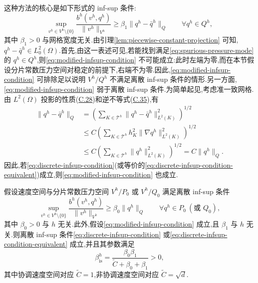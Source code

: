 \begin{note}\label{note:modified-infsup-condition}
这种方法的核心是如下形式的 inf-sup 条件:
\begin{equation}\label{eq:modified-infsup-condition}
  \sup_{v^h\in V^h\setminus\{0\}}
    \frac{b^h(v^h,q^h)}{\|v^h\|_{V^h}}
  \ge\beta_1\|q^h-\bar q^h\|_Q
  \qquad\forall q^h\in Q^h,
\end{equation}
其中 $\beta_1>0$ 与网格宽度无关.由引理\ref{lem:piecewise-constant-projection} 可知,$q^h-\bar q^h\in L_0^2(\Omega)$.首先,由这一表述可见,若能找到满足\cref{eq:spurious-pressure-mode} 的 $q^h\in Q^h$,则\cref{eq:modified-infsup-condition} 不可能成立:此时左端为零,而在本节假设分片常数压力空间对稳定的前提下,右端不为零.因此,\cref{eq:modified-infsup-condition} 可排除足以说明 $V^h/Q^h$ 不满足离散 inf-sup 条件的情形.另一方面,\cref{eq:modified-infsup-condition} 弱于离散 inf-sup 条件.为简单起见,考虑准一致网格.由 $L^2(\Omega)$ 投影的性质(\hyperref[eq:appendix-c-28]{C.28})和逆不等式(\hyperref[eq:appendix-c-35]{C.35}),有
\[
\begin{aligned}
  \|q^h-\bar q^h\|_Q
  &=\left(\sum_{K\in\mathcal{T}^h}
        \|q^h-\bar q^h\|_{L^2(K)}^2\right)^{1/2}\\
  &\le C\left(\sum_{K\in\mathcal{T}^h}
        h_K^2\|\nabla q^h\|_{L^2(K)}^2\right)^{1/2}\\
  &\le C\left(\sum_{K\in\mathcal{T}^h}
        \|q^h\|_{L^2(K)}^2\right)^{1/2}
   =C\|q^h\|_Q.
\end{aligned}
\]
因此,若\cref{eq:discrete-infsup-condition}(或等价的\cref{eq:discrete-infsup-condition-equivalent})成立,则\cref{eq:modified-infsup-condition} 也成立.
\end{note}

\begin{theorem}\label{thm:pressure-splitting-infsup}
假设速度空间与分片常数压力空间 $V^h/P_0$ 或 $V^h/Q_0$ 满足离散 inf-sup 条件
\begin{equation}\label{eq:piecewise-constant-infsup}
  \sup_{v^h\in V^h\setminus\{0\}}
    \frac{b^h(v^h,q^h)}{\|v^h\|_{V^h}}
  \ge\beta_0\|q^h\|_Q
  \qquad\forall q^h\in P_0\ (\text{或 }Q_0),
\end{equation}
其中 $\beta_0>0$ 与 $h$ 无关.此外,假设\cref{eq:modified-infsup-condition} 成立,且 $\beta_1$ 与 $h$ 无关.则离散 inf-sup 条件\cref{eq:discrete-infsup-condition} 或\cref{eq:discrete-infsup-condition-equivalent} 成立,并且其参数满足
\[
  \beta_{\mathrm{is}}^h
  =\frac{\beta_0\beta_1}{\widetilde C+\beta_0+\beta_1}>0,
\]
其中协调速度空间对应 $\widetilde C=1$,非协调速度空间对应 $\widetilde C=\sqrt{d}$.
\end{theorem}

